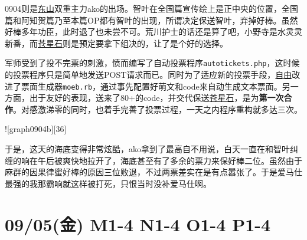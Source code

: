 
0904则是\uline{东山}双重主力ako的出场。智叶在全国篇宣传绘上是正中央的位置，全国篇和阿知贺篇乃至本篇OP都有智叶的出现，所谓决定保送智叶，弃掉好棒。虽然好棒多年功臣，此时退了也未尝不可。荒川护士的话还是算了吧，小野寺是水灵灵新番，而\uline{苍星石}则是预定要拿下组决的，让了是个好的选择。

军师受到了投不完票的刺激，愤而编写了自动投票程序\verb`autotickets.php`，这时候的投票程序只是简单地发送POST请求而已。同时为了适应新的投票手段，\uline{自由}改进了票面生成器\verb`moeb.rb`，通过事先配置好萌文和code来自动生成文本票面。另一方面，出于友好的表现，送来了80+的code，并交代保送\uline{苍星石}，是为\textbf{第一次合作}。对感激涕零的同时，也着手完善了投票过程，一天之内程序重构就多达三次。

![graph0904b][36]

于是，这天的海底变得非常炫酷，ako拿到了最高自不用说，白天一直在和智叶纠缠的响在午后被爽快地拉开了，海底甚至有了多余的票力来保好棒二位。虽然由于麻群的因果律蜜好棒的原因三位败退，不过两票差实在是有点嚣张了。于是爱马仕最强的我那霸响就这样被打死，只恨当时没补爱马仕啊。

\section{09/05(金) M1-4 N1-4 O1-4 P1-4}

